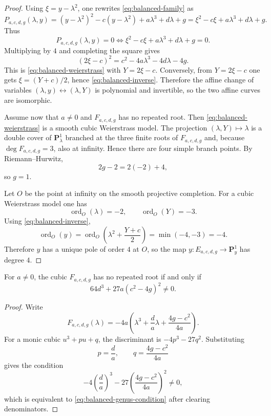 \begin{proof}
Using \(\xi=y-\lambda^2\), one rewrites \eqref{eq:balanced-family} as
\[
P_{a,c,d,g}(\lambda,y)
=
(y-\lambda^2)^2-c(y-\lambda^2)+a\lambda^3+d\lambda+g
=
\xi^2-c\xi+a\lambda^3+d\lambda+g.
\]
Thus
\[
P_{a,c,d,g}(\lambda,y)=0
\iff
\xi^2-c\xi+a\lambda^3+d\lambda+g=0.
\]
Multiplying by \(4\) and completing the square gives
\[
(2\xi-c)^2=c^2-4a\lambda^3-4d\lambda-4g.
\]
This is \eqref{eq:balanced-weierstrass} with \(Y=2\xi-c\).
Conversely, from \(Y=2\xi-c\) one gets \(\xi=(Y+c)/2\), hence \eqref{eq:balanced-inverse}.
Therefore the affine change of variables \((\lambda,y)\leftrightarrow(\lambda,Y)\) is polynomial and invertible, so the two affine curves are isomorphic.

Assume now that \(a\neq 0\) and \(F_{a,c,d,g}\) has no repeated root.
Then \eqref{eq:balanced-weierstrass} is a smooth cubic Weierstrass model.
The projection \((\lambda,Y)\mapsto \lambda\) is a double cover of \(\mathbf P^1_\lambda\) branched at the three finite roots of \(F_{a,c,d,g}\) and, because \(\deg F_{a,c,d,g}=3\), also at infinity.
Hence there are four simple branch points.
By Riemann--Hurwitz,
\[
2g-2=2(-2)+4,
\]
so \(g=1\).

Let \(O\) be the point at infinity on the smooth projective completion.
For a cubic Weierstrass model one has
\[
\operatorname{ord}_O(\lambda)=-2,
\qquad
\operatorname{ord}_O(Y)=-3.
\]
Using \eqref{eq:balanced-inverse},
\[
\operatorname{ord}_O(y)
=
\operatorname{ord}_O\!\left(\lambda^2+\frac{Y+c}{2}\right)
=
\min(-4,-3)
=
-4.
\]
Therefore \(y\) has a unique pole of order \(4\) at \(O\), so the map \(y:E_{a,c,d,g}\to\mathbf P^1_y\) has degree \(4\).
\end{proof}

\begin{corollary}\label{cor:balanced-smooth}
For \(a\neq 0\), the cubic \(F_{a,c,d,g}\) has no repeated root if and only if
\begin{equation}\label{eq:balanced-genus-condition}
64d^3+27a(c^2-4g)^2\neq 0.
\end{equation}
\end{corollary}

\begin{proof}
Write
\[
F_{a,c,d,g}(\lambda)
=
-4a\left(\lambda^3+\frac{d}{a}\lambda+\frac{4g-c^2}{4a}\right).
\]
For a monic cubic \(u^3+pu+q\), the discriminant is \(-4p^3-27q^2\).
Substituting
\[
p=\frac{d}{a},
\qquad
q=\frac{4g-c^2}{4a}
\]
gives the condition
\[
-4\left(\frac{d}{a}\right)^3-27\left(\frac{4g-c^2}{4a}\right)^2\neq 0,
\]
which is equivalent to \eqref{eq:balanced-genus-condition} after clearing denominators.
\end{proof}

